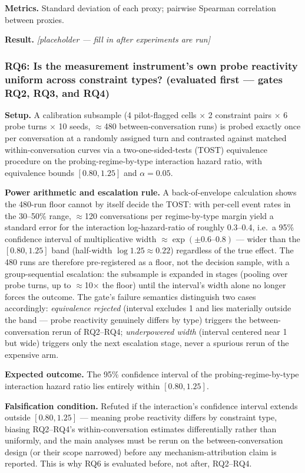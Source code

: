 \documentclass[11pt]{article}
\newcommand{\ph}{\textit{[placeholder --- fill in after experiments are run]}}
\begin{document}
\textbf{Metrics.} Standard deviation of each proxy; pairwise Spearman correlation between proxies.

\textbf{Result.} \ph

\subsubsection{RQ6: Is the measurement instrument's own probe reactivity uniform across constraint types? (evaluated first --- gates RQ2, RQ3, and RQ4)}
\textbf{Setup.} A calibration subsample (4 pilot-flagged cells $\times$ 2 constraint pairs $\times$ 6 probe turns $\times$ 10 seeds, $\approx$480 between-conversation runs) is probed exactly once per conversation at a randomly assigned turn and contrasted against matched within-conversation curves via a two-one-sided-tests (TOST) equivalence procedure on the probing-regime-by-type interaction hazard ratio, with equivalence bounds $[0.80, 1.25]$ and $\alpha = 0.05$.

\textbf{Power arithmetic and escalation rule.} A back-of-envelope calculation shows the 480-run floor cannot by itself decide the TOST: with per-cell event rates in the 30--50\% range, $\approx$120 conversations per regime-by-type margin yield a standard error for the interaction log-hazard-ratio of roughly 0.3--0.4, i.e.\ a 95\% confidence interval of multiplicative width $\approx \exp(\pm 0.6\text{--}0.8)$ --- wider than the $[0.80, 1.25]$ band (half-width $\log 1.25 \approx 0.22$) regardless of the true effect. The 480 runs are therefore pre-registered as a floor, not the decision sample, with a group-sequential escalation: the subsample is expanded in stages (pooling over probe turns, up to $\approx$10$\times$ the floor) until the interval's width alone no longer forces the outcome. The gate's failure semantics distinguish two cases accordingly: \emph{equivalence rejected} (interval excludes 1 and lies materially outside the band --- probe reactivity genuinely differs by type) triggers the between-conversation rerun of RQ2--RQ4; \emph{underpowered width} (interval centered near 1 but wide) triggers only the next escalation stage, never a spurious rerun of the expensive arm.

\textbf{Expected outcome.} The 95\% confidence interval of the probing-regime-by-type interaction hazard ratio lies entirely within $[0.80, 1.25]$.

\textbf{Falsification condition.} Refuted if the interaction's confidence interval extends outside $[0.80, 1.25]$ --- meaning probe reactivity differs by constraint type, biasing RQ2--RQ4's within-conversation estimates differentially rather than uniformly, and the main analyses must be rerun on the between-conversation design (or their scope narrowed) before any mechanism-attribution claim is reported. This is why RQ6 is evaluated before, not after, RQ2--RQ4.
\end{document}
